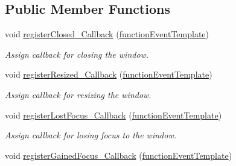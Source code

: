 \subsection*{Public Member Functions}
\begin{DoxyCompactItemize}
\item 
\hypertarget{class_event_system_a676f81108151e755f5d3fd6f8d8d4956}{void \hyperlink{class_event_system_a676f81108151e755f5d3fd6f8d8d4956}{register\-Closed\-\_\-\-Callback} (\hyperlink{_callback_manager_8h_a3459e948765053b6cb9e3b0b5efb5906}{function\-Event\-Template})}\label{dc/d0b/class_event_system_a676f81108151e755f5d3fd6f8d8d4956}

\begin{DoxyCompactList}\small\item\em Assign callback for closing the window. \end{DoxyCompactList}\item 
\hypertarget{class_event_system_ac8459dc6b34f3a9c8dac7e8c153fcfc2}{void \hyperlink{class_event_system_ac8459dc6b34f3a9c8dac7e8c153fcfc2}{register\-Resized\-\_\-\-Callback} (\hyperlink{_callback_manager_8h_a3459e948765053b6cb9e3b0b5efb5906}{function\-Event\-Template})}\label{dc/d0b/class_event_system_ac8459dc6b34f3a9c8dac7e8c153fcfc2}

\begin{DoxyCompactList}\small\item\em Assign callback for resizing the window. \end{DoxyCompactList}\item 
\hypertarget{class_event_system_a953eba6c6d8d19018bffe249d41c8ca6}{void \hyperlink{class_event_system_a953eba6c6d8d19018bffe249d41c8ca6}{register\-Lost\-Focus\-\_\-\-Callback} (\hyperlink{_callback_manager_8h_a3459e948765053b6cb9e3b0b5efb5906}{function\-Event\-Template})}\label{dc/d0b/class_event_system_a953eba6c6d8d19018bffe249d41c8ca6}

\begin{DoxyCompactList}\small\item\em Assign callback for losing focus to the window. \end{DoxyCompactList}\item 
\hypertarget{class_event_system_aef463781fcd6f14670983a9bbee15491}{void \hyperlink{class_event_system_aef463781fcd6f14670983a9bbee15491}{register\-Gained\-Focus\-\_\-\-Callback} (\hyperlink{_callback_manager_8h_a3459e948765053b6cb9e3b0b5efb5906}{function\-Event\-Template})}\label{dc/d0b/class_event_system_aef463781fcd6f14670983a9bbee15491}


\end{DoxyCompactItemize}
